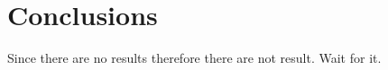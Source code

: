 \chapter{Conclusions}
\thispagestyle{myheadings}

Since there are no results therefore there are not result. Wait for it. 

